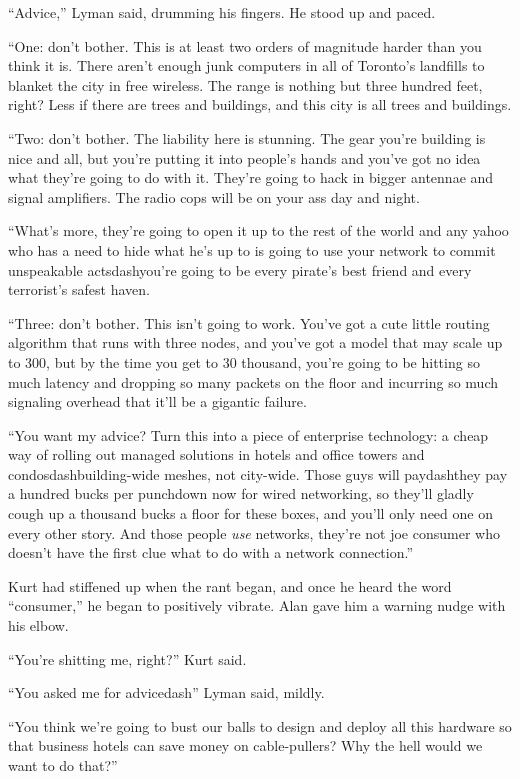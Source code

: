 ``Advice,'' Lyman said, drumming his fingers.  He stood up and paced.

``One:  don't bother.  This is at least two orders of magnitude harder
than you think it is.  There aren't enough junk computers in all of
Toronto's landfills to blanket the city in free wireless.  The range
is nothing but three hundred feet, right?  Less if there are trees and
buildings, and this city is all trees and buildings.

``Two:  don't bother.  The liability here is stunning.  The gear
you're building is nice and all, but you're putting it into people's
hands and you've got no idea what they're going to do with it. 
They're going to hack in bigger antennae and signal amplifiers.  The
radio cops will be on your ass day and night.

``What's more, they're going to open it up to the rest of the world
and any yahoo who has a need to hide what he's up to is going to use
your network to commit unspeakable actsdash{}you're going to be every
pirate's best friend and every terrorist's safest haven.

``Three:  don't bother.  This isn't going to work.  You've got a cute
little routing algorithm that runs with three nodes, and you've got a
model that may scale up to 300, but by the time you get to 30
thousand, you're going to be hitting so much latency and dropping so
many packets on the floor and incurring so much signaling overhead
that it'll be a gigantic failure.

``You want my advice?  Turn this into a piece of enterprise
technology:  a cheap way of rolling out managed solutions in hotels
and office towers and condosdash{}building-wide meshes, not city-wide. 
Those guys will paydash{}they pay a hundred bucks per punchdown now for
wired networking, so they'll gladly cough up a thousand bucks a floor
for these boxes, and you'll only need one on every other story.  And
those people \textit{use} networks, they're not joe consumer who
doesn't have the first clue what to do with a network connection.''

Kurt had stiffened up when the rant began, and once he heard the word
``consumer,'' he began to positively vibrate.  Alan gave him a warning
nudge with his elbow.

``You're shitting me, right?'' Kurt said.

``You asked me for advicedash{}'' Lyman said, mildly.

``You think we're going to bust our balls to design and deploy all
this hardware so that business hotels can save money on cable-pullers? 
Why the hell would we want to do that?''

